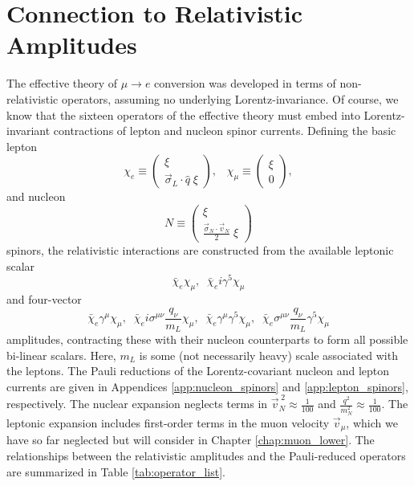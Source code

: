 \documentclass[12pt,letterpaper]{book}
\begin{document}
\section{Connection to Relativistic Amplitudes}
\label{sec:relativistic}
The effective theory of $\mu\rightarrow e$ conversion was developed in terms of non-relativistic operators, assuming no underlying Lorentz-invariance. Of course, we know that the sixteen operators of the effective theory must embed into Lorentz-invariant contractions of lepton and nucleon spinor currents. Defining the basic lepton
\begin{equation}
\chi_e\equiv \left(\begin{array}{c}
\xi\\
\vec{\sigma}_L\cdot\hat{q}\;\xi
\end{array}\right),\;\;\;\chi_{\mu}\equiv\left(\begin{array}{c}
\xi\\
0
\end{array}\right),
\end{equation}
and nucleon
\begin{equation}
N\equiv\left(\begin{array}{c}
\xi\\
\frac{\vec{\sigma}_N\cdot\vec{v}_N}{2}\;\xi
\end{array}\right)
\end{equation}
spinors, the relativistic interactions are constructed from the available leptonic scalar
\begin{equation}
\bar{\chi}_e\chi_{\mu},\;\;\bar{\chi}_ei\gamma^5\chi_{\mu}
\end{equation}
and four-vector
\begin{equation}
\bar{\chi}_e\gamma^{\mu}\chi_{\mu},\;\;\bar{\chi}_ei\sigma^{\mu\nu}\frac{q_{\nu}}{m_L}\chi_{\mu},\;\;\bar{\chi}_e\gamma^{\mu}\gamma^5\chi_{\mu},\;\;\bar{\chi}_e\sigma^{\mu\nu}\frac{q_{\nu}}{m_L}\gamma^5\chi_{\mu}
\end{equation}
amplitudes, contracting these with their nucleon counterparts to form all possible bi-linear scalars. Here, $m_L$ is some (not necessarily heavy) scale associated with the leptons. The Pauli reductions of the Lorentz-covariant nucleon and lepton currents are given in Appendices \ref{app:nucleon_spinors} and \ref{app:lepton_spinors}, respectively. The nuclear expansion neglects terms in $\vec{v}_N^{\;2}\approx\frac{1}{100}$ and $\frac{q^2}{m_N^2}\approx\frac{1}{100}$. The leptonic expansion includes first-order terms in the muon velocity $\vec{v}_{\mu}$, which we have so far neglected but will consider in Chapter \ref{chap:muon_lower}. The relationships between the relativistic amplitudes and the Pauli-reduced operators are summarized in Table \ref{tab:operator_list}.
\end{document}
